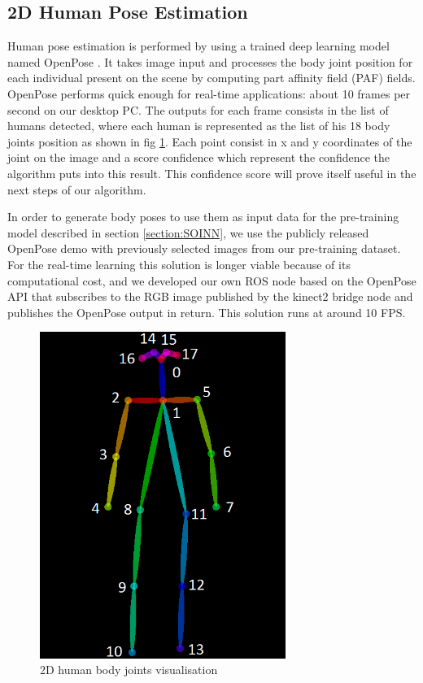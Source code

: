 \subsection{2D Human Pose Estimation}
\label{section:openpose}
Human pose estimation is performed by using a trained deep learning model named OpenPose \cite{Openpose}. It takes image input and processes the body joint position for each individual present on the scene by computing part affinity field (PAF) fields. OpenPose performs quick enough for real-time applications: about 10 frames per second on our desktop PC. The outputs for each frame consists in the list of humans detected, where each human is represented as the list of his 18 body joints position as shown in fig \ref{fig:2D_joints_vis}. Each point consist in x and y coordinates of the joint on the image and a score confidence which represent the confidence the algorithm puts into this result. This confidence score will prove itself useful in the next steps of our algorithm.

In order to generate body poses to use them as input data for the pre-training model described in section \ref{section:SOINN}, we use the publicly released OpenPose demo with previously selected images from our pre-training dataset. For the real-time learning this solution is longer viable because of its computational cost, and we developed our own ROS node based on the OpenPose API that subscribes to the RGB image published by the kinect2 bridge node and publishes the OpenPose output in return. This solution runs at around 10 FPS.

\begin{figure}[ht]
    \centering
    \includegraphics[width=80mm, keepaspectratio]{images/2D_body_joints_visualisation.png}
    \caption{2D human body joints visualisation}
    \label{fig:2D_joints_vis}
\end{figure}

